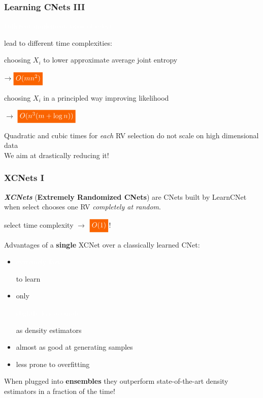 \documentclass[xcolor={usenames,dvipsnames,svgnames}, compress]{beamer}
\newcommand{\highlight}[2][yellow]{\mathchoice%
  {\colorbox{#1}{\strut\textcolor{white}{$\displaystyle{#2}$}}}%
  {\colorbox{#1}{\strut\textcolor{white}{$\textstyle{#2}$}}}%
  {\colorbox{#1}{\strut\textcolor{white}{$\scriptstyle{#2}$}}}%
  {\colorbox{#1}{\strut\textcolor{white}{$\scriptscriptstyle{#2}$}}}}%
\newcommand{\highlighttext}[2][yellow]{{\colorbox{#1}{\strut\textcolor{white}{#2}}}}
\begin{document}
\begin{frame}[t]
  \frametitle{Learning CNets III}
  \small

  \highlighttext[gold4]{Different implementations of \textsf{select}}
  lead to different time complexities:
  \begin{center}
      \begin{minipage}{0.9\linewidth}
        \begin{description}[align=parright]
        \item[\textbf{\textsf{entCNet}}] choosing
          $X_{i}$ to lower approximate average joint entropy~\parencite{Rahman2014}\par
          {\hfill $\rightarrow\highlight[gold4]{O(mn^2)}$}
        \item[\textbf{\textsf{dCSN}}] choosing
          $X_{i}$ in a principled way improving likelihood~\parencite{DiMauro2015a}\par
          {\hfill $\rightarrow$ $\highlight[gold4]{O(n^3(m + \log n))}$}
        \end{description}
      \end{minipage}
    \end{center}

  Quadratic and cubic times for \emph{each} RV selection do not scale
  on high dimensional data\\
  We aim at drastically reducing it!
\end{frame}

\begin{frame}[t]
  \frametitle{XCNets I}
\small
  \emph{\textbf{XCNets}} (\textbf{Extremely Randomized CNets}) are CNets built by \textsf{LearnCNet} when
    \textsf{select} chooses one RV \emph{completely at random}.\par
    {\hfill\textsf{select} time complexity $\rightarrow$ $\highlight[gold4]{O(1)}$!}
    \vspace{20pt}

    Advantages of a \textbf{single} XCNet over a classically learned CNet:
    \begin{itemize}
      \setlength{\itemsep}{-3pt}
      \item \highlighttext[gold4]{extremely fast} to learn
    \item only \highlighttext[lacamlilac]{slightly less accurate} as density estimators
    \item almost as good at generating samples
    \item less prone to overfitting
    \end{itemize}
\vspace{20pt}

When plugged into \textbf{ensembles} they outperform state-of-the-art
density estimators in a fraction of the time!
\end{frame}
\end{document}
